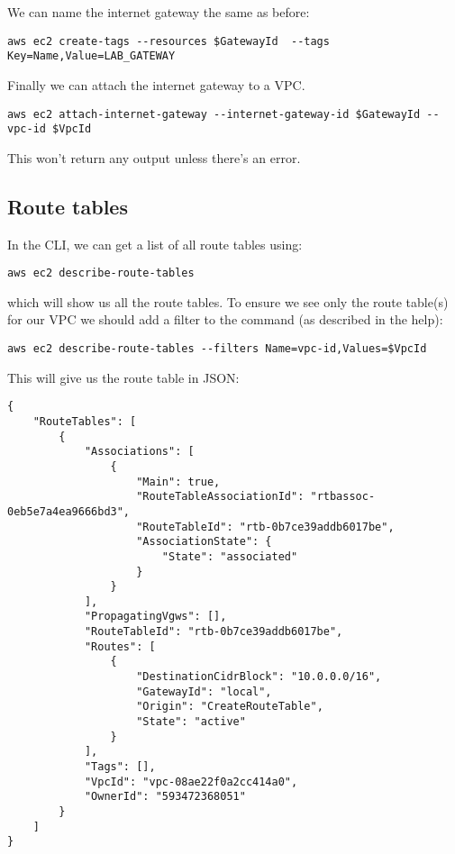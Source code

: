 We can name the internet gateway the same as before:

\begin{verbatim}
aws ec2 create-tags --resources $GatewayId  --tags Key=Name,Value=LAB_GATEWAY
\end{verbatim}

Finally we can attach the internet gateway to a VPC.

\begin{verbatim}
aws ec2 attach-internet-gateway --internet-gateway-id $GatewayId --vpc-id $VpcId
\end{verbatim}

This won't return any output unless there's an error.

\subsection{Route tables}
\label{route-tables}

In the CLI, we can get a list of all route tables using:

\begin{verbatim}
aws ec2 describe-route-tables
\end{verbatim}

which will show us all the route tables. To ensure we see only the route
table(s) for our VPC we should add a filter to the command (as described
in the help):

\begin{verbatim}
aws ec2 describe-route-tables --filters Name=vpc-id,Values=$VpcId
\end{verbatim}

This will give us the route table in JSON:

\begin{verbatim}
{
    "RouteTables": [
        {
            "Associations": [
                {
                    "Main": true,
                    "RouteTableAssociationId": "rtbassoc-0eb5e7a4ea9666bd3",
                    "RouteTableId": "rtb-0b7ce39addb6017be",
                    "AssociationState": {
                        "State": "associated"
                    }
                }
            ],
            "PropagatingVgws": [],
            "RouteTableId": "rtb-0b7ce39addb6017be",
            "Routes": [
                {
                    "DestinationCidrBlock": "10.0.0.0/16",
                    "GatewayId": "local",
                    "Origin": "CreateRouteTable",
                    "State": "active"
                }
            ],
            "Tags": [],
            "VpcId": "vpc-08ae22f0a2cc414a0",
            "OwnerId": "593472368051"
        }
    ]
}
\end{verbatim}

